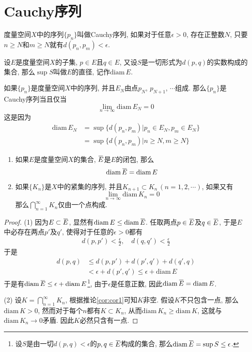 \documentclass[cn,12pt,math=mtpro2,citestyle=gb7714-2015,bibstyle=gb7714-2015,twocol]{elegantbook}
\newcommand{\diam}{\text{diam}\,}
\newcommand{\limn }{\lim_{n\to\infty}}
\newcommand{\overbar}[1]{\mkern 1.5mu\overline{\mkern-1.5mu#1\mkern-1.5mu}\mkern 1.5mu}
\begin{document}
\section{Cauchy序列}
\begin{definition}
度量空间$X$中的序列$\{p_n\}$叫做Cauchy序列, 如果对于任意$\epsilon>0$, 存在正整数$N$, 只要$n\geq N$和$m\geq N$就有$d(p_n,p_m)<\epsilon$.
\end{definition}
\begin{definition}
设$E$是度量空间$X$的子集, $p\in E$且$q\in E$, 又设$S$是一切形式为$d(p,q)$的实数构成的集合, 那么$\sup S$叫做$E$的直径, 记作$\diam E$.
\end{definition}
如果$\{p_n\}$是度量空间$X$中的序列, 并且$E_N$由点$p_N$, $p_{N+1}$, $\cdots$组成. 那么$\{p_n\}$是Cauchy序列当且仅当
$$\limn \diam E_N=0$$
这是因为
\begin{align*}
\diam E_N&=\sup\{d(p_n,p_m)|p_n\in E_N, p_m\in E_N\} \\
&=\sup\{d(p_n,p_m)|n\geq N, m\geq N\}
\end{align*}
\begin{theorem}\label{thm:th3.3}
   \begin{enumerate}[label=(\arabic*)]
  \item 如果$E$是度量空间$X$的集合, $\overbar{E}$是$E$的闭包, 那么
  $$\diam\overbar{E}=\diam E$$

  \item 如果$\{K_n\}$是$X$中的紧集的序列, 并且$K_{n+1}\subset K_n\,(n=1,2,\cdots)$, 如果又有
  $$\limn \diam K_n=0$$
  那么$\bigcap_{n=1}^\infty K_n$仅由一个点构成.
  \end{enumerate}
\end{theorem}
\begin{proof}
  (1) 因为$E\subset \overbar{E}$, 显然有$\diam E\leq\diam\overbar{E}$. 任取两点$p\in\overbar{E}$及$q\in\overbar{E}$, 于是$E$中必存在两点$p'$及$q'$, 使得对于任意的$\epsilon>0$都有
  \begin{align*}
  d(p,p')<\frac{\epsilon}{2},\quad d(q,q')<\frac{\epsilon}{2}
  \end{align*}
  于是
  \begin{align*}
  d(p,q)&\leq d(p,p')+d(p',q')+d(q',q) \\
  &<\epsilon+d(p',q')\leq \epsilon+\diam E
  \end{align*}
  于是有$\diam\overbar{E}\leq \epsilon+\diam E$\footnote{设$S$是由一切$d(p,q)<\epsilon$的$p, q\in \overbar{E}$构成的集合, 那么$\diam \overbar{E}=\sup S\leq \epsilon$.}, 由于$\epsilon$是任意正数, 因此$\diam\overbar{E}=\diam E$.

  (2) 设$K= \bigcap_{n=1}^\infty K_n$, 根据推论\ref{cor:cor1}可知$K$非空. 假设$K$不只包含一点, 那么$\diam K>0$, 然而对于每个$n$都有$K\subset K_n$, 从而$\diam K_n\geq\diam K$, 这就与$\diam K_n\rightarrow 0$矛盾. 因此$K$必然只含有一点.
\end{proof}
\end{document}
